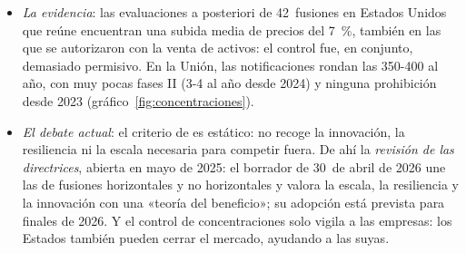\documentclass[11pt]{article}
\begin{document}
\begin{itemize}
\begin{itemize}
  \end{itemize}
\item \emph{La evidencia}: las evaluaciones a posteriori de 42~fusiones en Estados Unidos que reúne \textcite{Kwoka2015Mergers} encuentran una subida media de precios del 7~\%, también en las que se autorizaron con la venta de activos: el control fue, en conjunto, demasiado permisivo. En la Unión, las notificaciones rondan las 350-400 al año, con muy pocas fases II (3-4 al año desde 2024) y ninguna prohibición desde 2023 (gráfico~\ref{fig:concentraciones}).
\item \emph{El debate actual}: el criterio de  es estático: no recoge la innovación, la resiliencia ni la escala necesaria para competir fuera. De ahí la \emph{revisión de las directrices}, abierta en mayo de 2025: el borrador de 30~de abril de 2026 une las de fusiones horizontales y no horizontales y valora la escala, la resiliencia y la innovación con una «teoría del beneficio»; su adopción está prevista para finales de 2026\nocite{CE2026DirectricesBorrador}. Y el control de concentraciones solo vigila a las empresas: los Estados también pueden cerrar el mercado, ayudando a las suyas.
\end{itemize}
\end{document}
